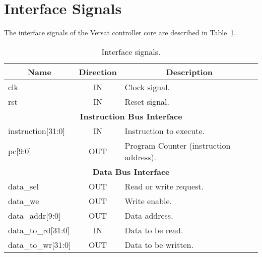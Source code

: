 \section{Interface Signals}
\label{sec:is}

The interface signals of the Versat controller core are described in Table~\ref{tab:is}..

\begin{table}[h]
\centering
\begin{tabular}{|l|c|l|}
\hline
\multicolumn{1}{|c|}{\bf Name} & {\bf Direction} & \multicolumn{1}{c|}{\bf Description} \\ 
\hline \hline
\multicolumn{1}{|l|}{clk}                & IN    & Clock signal.\\ 
\hline
\multicolumn{1}{|l|}{rst}                & IN    & \multicolumn{1}{l|}{Reset signal.}\\
\hline \hline
\multicolumn{3}{|c|}{{\bf Instruction Bus Interface}}\\ 
\hline \hline
instruction[31:0]                        & IN    & Instruction to execute.\\ 
\hline
pc[9:0]                                  & OUT   & Program Counter (instruction address).\\ 
\hline \hline
\multicolumn{3}{|c|}{{\bf Data Bus Interface}}\\ 
\hline \hline
data\_sel                                & OUT   & Read or write request.\\ 
\hline
data\_we                                 & OUT   & Write enable.\\ 
\hline
data\_addr[9:0]                          & OUT   & Data address.\\ 
\hline
data\_to\_rd[31:0]                       & IN    & Data to be read.\\ 
\hline
data\_to\_wr[31:0]                       & OUT   & Data to be written. \\ 
\hline
\end{tabular}
\caption{Interface signals.}
\label{tab:is}
\end{table}

